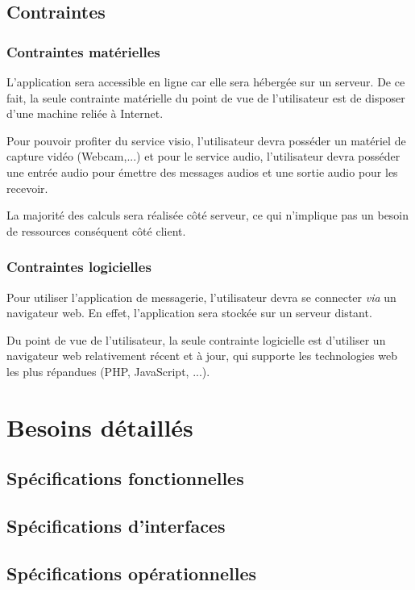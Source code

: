 \documentclass[11pt,dvipsnames,svgnames]{report}
\begin{document}
\section{Contraintes}
\subsection{Contraintes matérielles}
L'application sera accessible en ligne car elle sera hébergée sur un serveur. De ce fait, la seule contrainte matérielle du point de vue de l'utilisateur est de disposer d'une machine reliée à Internet. 

Pour pouvoir profiter du service visio, l'utilisateur devra posséder un matériel de capture vidéo (Webcam,...) et pour le service audio, l'utilisateur devra posséder une entrée audio pour émettre des messages audios et une sortie audio pour les recevoir.


La majorité des calculs sera réalisée côté serveur, ce qui n'implique pas un besoin de ressources conséquent côté client.

\subsection{Contraintes logicielles}
Pour utiliser l'application de messagerie, l'utilisateur devra se connecter \emph{via} un navigateur web. En effet, l'application sera stockée sur un serveur distant. 

Du point de vue de l'utilisateur, la seule contrainte logicielle est d'utiliser un navigateur web relativement récent et à jour, qui supporte les technologies web les plus répandues (PHP, JavaScript, ...).


\chapter{Besoins détaillés}
\section{Spécifications fonctionnelles}

\section{Spécifications d'interfaces}

\section{Spécifications opérationnelles}
\end{document}
